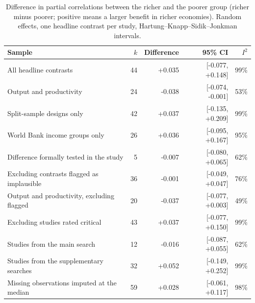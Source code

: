 \begin{table}[ht]\centering\small
\caption{Difference in partial correlations between the richer and the poorer group (richer minus poorer; positive means a larger benefit in richer economies). Random effects, one headline contrast per study, Hartung--Knapp--Sidik--Jonkman intervals.}\label{tab:csens}
\begin{tabular}{@{}lrrrr@{}}\toprule Sample & $k$ & Difference & 95\% CI & $I^2$\\\midrule
All headline contrasts & 44 & +0.035 & [-0.077, +0.148] & 99\%\\
Output and productivity & 24 & -0.038 & [-0.074, -0.001] & 53\%\\
Split-sample designs only & 42 & +0.037 & [-0.135, +0.209] & 99\%\\
World Bank income groups only & 26 & +0.036 & [-0.095, +0.167] & 95\%\\
Difference formally tested in the study & 5 & -0.007 & [-0.080, +0.065] & 62\%\\
Excluding contrasts flagged as implausible & 36 & -0.001 & [-0.049, +0.047] & 76\%\\
Output and productivity, excluding flagged & 20 & -0.037 & [-0.077, +0.003] & 49\%\\
Excluding studies rated critical & 43 & +0.037 & [-0.077, +0.150] & 99\%\\
Studies from the main search & 12 & -0.016 & [-0.087, +0.055] & 62\%\\
Studies from the supplementary searches & 32 & +0.052 & [-0.149, +0.252] & 99\%\\
Missing observations imputed at the median & 59 & +0.028 & [-0.061, +0.117] & 98\%\\
\bottomrule\end{tabular}\end{table}

